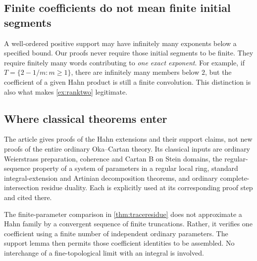\documentclass[11pt]{article}
\theoremstyle{definition}
\begin{document}
\subsection{Finite coefficients do not mean finite initial segments}
A well-ordered positive support may have infinitely many exponents below a specified bound. Our proofs never require those initial segments to be finite. They require finitely many words contributing to \emph{one exact exponent}. For example, if $T=\{2-1/m:m\ge1\}$, there are infinitely many members below $2$, but the coefficient of a given Hahn product is still a finite convolution. This distinction is also what makes \cref{ex:ranktwo} legitimate.

\subsection{Where classical theorems enter}
The article gives proofs of the Hahn extensions and their support claims, not new proofs of the entire ordinary Oka--Cartan theory. Its classical inputs are ordinary Weierstrass preparation, coherence and Cartan B on Stein domains, the regular-sequence property of a system of parameters in a regular local ring, standard integral-extension and Artinian decomposition theorems, and ordinary complete-intersection residue duality. Each is explicitly used at its corresponding proof step and cited there.

The finite-parameter comparison in \cref{thm:traceresidue} does not approximate a Hahn family by a convergent sequence of finite truncations. Rather, it verifies one coefficient using a finite number of independent ordinary parameters. The support lemma then permits those coefficient identities to be assembled. No interchange of a fine-topological limit with an integral is involved.
\end{document}
